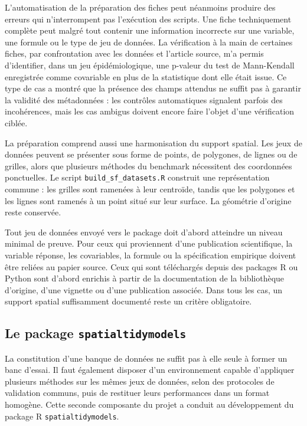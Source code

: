 \documentclass[11pt,a4paper]{article}
\begin{document}
L'automatisation de la préparation des fiches peut néanmoins produire des erreurs qui n'interrompent pas l'exécution des scripts. Une fiche techniquement complète peut malgré tout contenir une information incorrecte sur une variable, une formule ou le type de jeu de données. La vérification à la main de certaines fiches, par confrontation avec les données et l'article source, m'a permis d'identifier, dans un jeu épidémiologique, une p-valeur du test de Mann-Kendall enregistrée comme covariable en plus de la statistique dont elle était issue. Ce type de cas a montré que la présence des champs attendus ne suffit pas à garantir la validité des métadonnées : les contrôles automatiques signalent parfois des incohérences, mais les cas ambigus doivent encore faire l'objet d'une vérification ciblée.

La préparation comprend aussi une harmonisation du support spatial. Les jeux de données peuvent se présenter sous forme de points, de polygones, de lignes ou de grilles, alors que plusieurs méthodes du benchmark nécessitent des coordonnées ponctuelles. Le script \texttt{build\_sf\_datasets.R} construit une représentation commune : les grilles sont ramenées à leur centroïde, tandis que les polygones et les lignes sont ramenés à un point situé sur leur surface. La géométrie d'origine reste conservée.

Tout jeu de données envoyé vers le package doit d'abord atteindre un niveau minimal de preuve. Pour ceux qui proviennent d'une publication scientifique, la variable réponse, les covariables, la formule ou la spécification empirique doivent être reliées au papier source. Ceux qui sont téléchargés depuis des packages R ou Python sont d'abord enrichis à partir de la documentation de la bibliothèque d'origine, d'une vignette ou d'une publication associée. Dans tous les cas, un support spatial suffisamment documenté reste un critère obligatoire.

\subsection{Le package \texttt{spatialtidymodels}}

La constitution d'une banque de données ne suffit pas à elle seule à former un banc d'essai. Il faut également disposer d'un environnement capable d'appliquer plusieurs méthodes sur les mêmes jeux de données, selon des protocoles de validation communs, puis de restituer leurs performances dans un format homogène. Cette seconde composante du projet a conduit au développement du package R \texttt{spatialtidymodels}.
\end{document}
